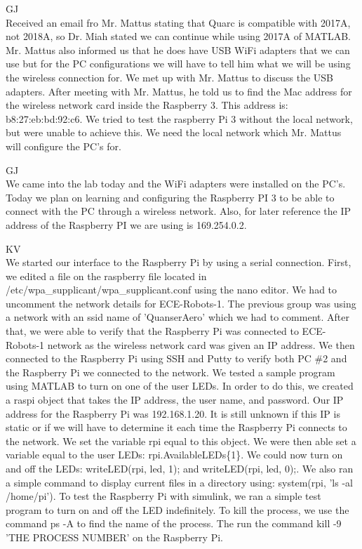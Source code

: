 \documentclass[fontsize=11pt, %
                             paper=letter, %
                             openany, %
                             captions=tableheading,
                             index=totoc,
                             hyperref]{labbook}
\begin{document}
\begin{addmargin}[0cm]{0cm}

GJ\\
Received an email fro Mr. Mattus stating that Quarc is compatible with 2017A, not 2018A, so Dr. Miah stated we can continue while using 2017A of MATLAB.  Mr. Mattus also informed us that he does have USB WiFi adapters that we can use but for the PC configurations we will have to tell him what we will be using the wireless connection for.  We met up with Mr. Mattus to discuss the USB adapters.  After meeting with Mr. Mattus, he told us to find the Mac address for the wireless network card inside the Raspberry 3. This address is:  b8:27:eb:bd:92:c6.  We tried to test the raspberry Pi 3 without the local network, but were unable to achieve this. We need the local network which Mr. Mattus will configure the PC's for.



GJ\\
We came into the lab today and the WiFi adapters were installed on the PC's.  Today we plan on learning and configuring the Raspberry PI 3 to be able to connect with the PC through a wireless network.  Also, for later reference the IP address of the Raspberry PI we are using is 169.254.0.2.

KV\\
We started our interface to the Raspberry Pi by using a serial connection.  First, we edited a file on the raspberry file located in /etc/wpa\_supplicant/wpa\_supplicant.conf using the nano editor.  We had to uncomment the network details for ECE-Robots-1.  The previous group was using a network with an ssid name of 'QuanserAero' which we had to comment.  After that, we were able to verify that the Raspberry Pi was connected to ECE-Robots-1 network as the wireless network card was given an IP address.  We then connected to the Raspberry Pi using SSH and Putty to verify both PC \#2 and the Raspberry Pi we connected to the network.  We tested a sample program using MATLAB to turn on one of the user LEDs.  In order to do this, we created a raspi object that takes the IP address, the user name, and password.  Our IP address for the Raspberry Pi was 192.168.1.20.  It is still unknown if this IP is static or if we will have to determine it each time the Raspberry Pi connects to the network.  We set the variable rpi equal to this object.  We were then able set a variable equal to the user LEDs: rpi.AvailableLEDs\{1\}. We could now turn on and off the LEDs: writeLED(rpi, led, 1); and writeLED(rpi, led, 0);.  We also ran a simple command to display current files in a directory using: system(rpi, 'ls -al /home/pi').  To test the Raspberry Pi with simulink, we ran a simple test program to turn on and off the LED indefinitely.  To kill the process, we use the command ps -A to find the name of the process.  The run the command kill -9 'THE PROCESS NUMBER' on the Raspberry Pi.


\end{addmargin}
\end{document}
